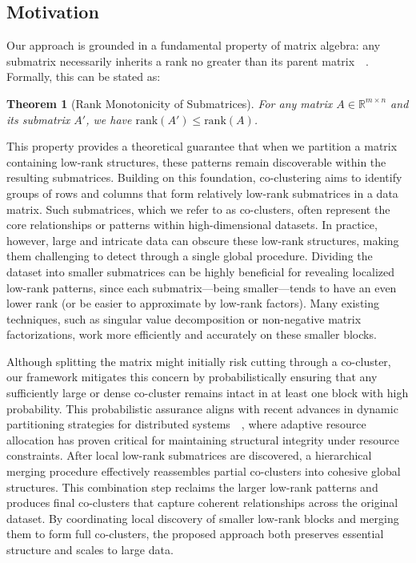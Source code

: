 \documentclass[journal]{IEEEtran}
\newtheorem{theorem}{Theorem}
\renewcommand{\cite}[1]{~\autocite{#1}}
\begin{document}
\subsection{Motivation}
\label{subsec:motivation}

Our approach is grounded in a fundamental property of matrix algebra: any submatrix necessarily inherits a rank no greater than its parent matrix~\cite{horn1985MatrixAnalysis}. Formally, this can be stated as:

\begin{theorem}[Rank Monotonicity of Submatrices]
    \label{thm:rank_monotonicity}
    For any matrix $A \in \mathbb{R}^{m \times n}$ and its submatrix $A'$, we have $\text{rank}(A') \leq \text{rank}(A)$.
\end{theorem}

This property provides a theoretical guarantee that when we partition a matrix containing low-rank structures, these patterns remain discoverable within the resulting submatrices. Building on this foundation, co-clustering aims to identify groups of rows and columns that form relatively low-rank submatrices in a data matrix. Such submatrices, which we refer to as co-clusters, often represent the core relationships or patterns within high-dimensional datasets. In practice, however, large and intricate data can obscure these low-rank structures, making them challenging to detect through a single global procedure. Dividing the dataset into smaller submatrices can be highly beneficial for revealing localized low-rank patterns, since each submatrix—being smaller—tends to have an even lower rank (or be easier to approximate by low-rank factors). Many existing techniques, such as singular value decomposition or non-negative matrix factorizations, work more efficiently and accurately on these smaller blocks.

Although splitting the matrix might initially risk cutting through a co-cluster, our framework mitigates this concern by probabilistically ensuring that any sufficiently large or dense co-cluster remains intact in at least one block with high probability. This probabilistic assurance aligns with recent advances in dynamic partitioning strategies for distributed systems~\cite{huang2024EnergyAwareIntegratedNeural}, where adaptive resource allocation has proven critical for maintaining structural integrity under resource constraints. After local low-rank submatrices are discovered, a hierarchical merging procedure effectively reassembles partial co-clusters into cohesive global structures. This combination step reclaims the larger low-rank patterns and produces final co-clusters that capture coherent relationships across the original dataset. By coordinating local discovery of smaller low-rank blocks and merging them to form full co-clusters, the proposed approach both preserves essential structure and scales to large data.
\end{document}
